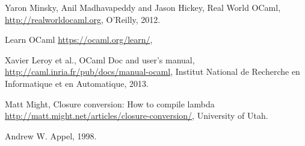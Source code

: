 \documentclass{article}
\begin{document}
\begin{thebibliography}{9}

	Yaron Minsky, Anil Madhavapeddy and Jason Hickey,
	Real World OCaml,
	\url{http://realworldocaml.org},
	O'Reilly,
	2012.

	Learn OCaml
	\url{https://ocaml.org/learn/},

	Xavier Leroy et al.,
	OCaml Doc and user's manual,
	\url{http://caml.inria.fr/pub/docs/manual-ocaml},
	Institut National de Recherche en Informatique et en Automatique,
	2013.

	Matt Might,
  Closure conversion: How to compile lambda
	\url{http://matt.might.net/articles/closure-conversion/},
  University of Utah.
   
    Andrew W. Appel,
    1998.

\end{thebibliography}
\end{document}
